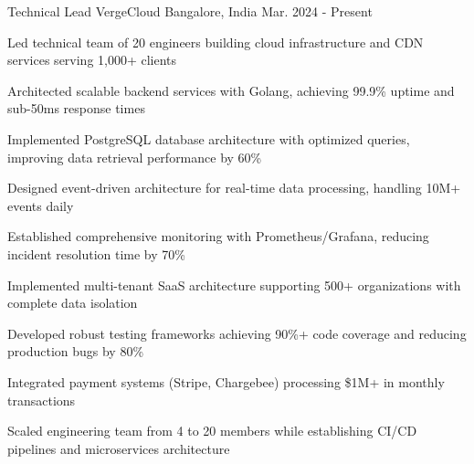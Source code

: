 

\begin{cventries}

  \cventry
    {Technical Lead} %
    {VergeCloud} %
    {Bangalore, India} %
    {Mar. 2024 - Present} %
    {
      \begin{cvitems} %
        \item {Led technical team of 20 engineers building cloud infrastructure and CDN services serving 1,000+ clients}
        \item {Architected scalable backend services with Golang, achieving 99.9\% uptime and sub-50ms response times}
        \item {Implemented PostgreSQL database architecture with optimized queries, improving data retrieval performance by 60\%}
        \item {Designed event-driven architecture for real-time data processing, handling 10M+ events daily}
        \item {Established comprehensive monitoring with Prometheus/Grafana, reducing incident resolution time by 70\%}
        \item {Implemented multi-tenant SaaS architecture supporting 500+ organizations with complete data isolation}
        \item {Developed robust testing frameworks achieving 90\%+ code coverage and reducing production bugs by 80\%}
        \item {Integrated payment systems (Stripe, Chargebee) processing \$1M+ in monthly transactions}
        \item {Scaled engineering team from 4 to 20 members while establishing CI/CD pipelines and microservices architecture}
      \end{cvitems}
    }


\end{cventries}
